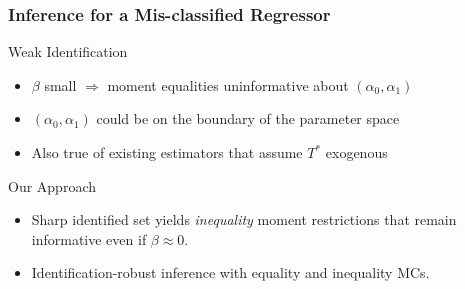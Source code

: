 \documentclass[handout]{beamer}
\begin{document}

\begin{frame}[label=INEQ_BODY]
  \frametitle{Inference for a Mis-classified Regressor}
  \small

  \begin{block}{Weak Identification}
\begin{itemize}
  \item $\beta$ small $\Rightarrow$ moment equalities uninformative about $(\alpha_0, \alpha_1)$ \hyperlink{MEQS_APPEND}{}
  \item $(\alpha_0, \alpha_1)$ could be on the boundary of the parameter space
  \item Also true of existing estimators that assume $T^*$ exogenous
\end{itemize}
\end{block}

\begin{alertblock}{Our Approach}

  \begin{itemize}
    \item Sharp identified set yields \emph{inequality} moment restrictions that remain informative even if $\beta \approx 0$.
      \hyperlink{INEQ_APPEND}{}
    \item Identification-robust inference with equality and inequality MCs.
  \end{itemize}
\end{alertblock}



\end{frame}

\end{document}
